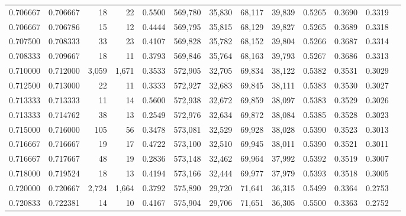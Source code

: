 \begin{tabular}{rrrrrrrrrrrrr}
0.706667 & 0.706667 &     18 &    22 &                                     0.5500 & 569,780 &  35,830 &  68,117 &  39,839 & 0.5265 & 0.3690 & 0.3319 \\
0.706667 & 0.706786 &     15 &    12 &                                     0.4444 & 569,795 &  35,815 &  68,129 &  39,827 & 0.5265 & 0.3689 & 0.3318 \\
0.707500 & 0.708333 &     33 &    23 &                                     0.4107 & 569,828 &  35,782 &  68,152 &  39,804 & 0.5266 & 0.3687 & 0.3314 \\
0.708333 & 0.709667 &     18 &    11 &                                     0.3793 & 569,846 &  35,764 &  68,163 &  39,793 & 0.5267 & 0.3686 & 0.3313 \\
0.710000 & 0.712000 &  3,059 & 1,671 &                                     0.3533 & 572,905 &  32,705 &  69,834 &  38,122 & 0.5382 & 0.3531 & 0.3029 \\
0.712500 & 0.713000 &     22 &    11 &                                     0.3333 & 572,927 &  32,683 &  69,845 &  38,111 & 0.5383 & 0.3530 & 0.3027 \\
0.713333 & 0.713333 &     11 &    14 &                                     0.5600 & 572,938 &  32,672 &  69,859 &  38,097 & 0.5383 & 0.3529 & 0.3026 \\
0.713333 & 0.714762 &     38 &    13 &                                     0.2549 & 572,976 &  32,634 &  69,872 &  38,084 & 0.5385 & 0.3528 & 0.3023 \\
0.715000 & 0.716000 &    105 &    56 &                                     0.3478 & 573,081 &  32,529 &  69,928 &  38,028 & 0.5390 & 0.3523 & 0.3013 \\
0.716667 & 0.716667 &     19 &    17 &                                     0.4722 & 573,100 &  32,510 &  69,945 &  38,011 & 0.5390 & 0.3521 & 0.3011 \\
0.716667 & 0.717667 &     48 &    19 &                                     0.2836 & 573,148 &  32,462 &  69,964 &  37,992 & 0.5392 & 0.3519 & 0.3007 \\
0.718000 & 0.719524 &     18 &    13 &                                     0.4194 & 573,166 &  32,444 &  69,977 &  37,979 & 0.5393 & 0.3518 & 0.3005 \\
0.720000 & 0.720667 &  2,724 & 1,664 &                                     0.3792 & 575,890 &  29,720 &  71,641 &  36,315 & 0.5499 & 0.3364 & 0.2753 \\
0.720833 & 0.722381 &     14 &    10 &                                     0.4167 & 575,904 &  29,706 &  71,651 &  36,305 & 0.5500 & 0.3363 & 0.2752 \\

\end{tabular}
